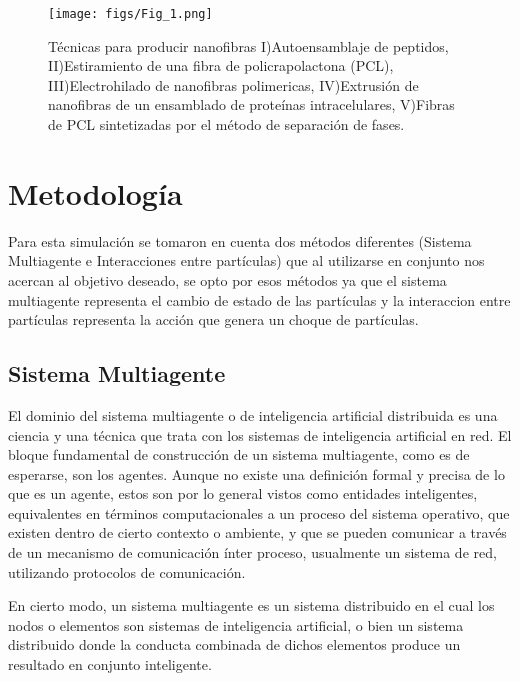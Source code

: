 \documentclass[a4paper,fleqn]{cas-sc}
\begin{document}
\begin{figure}[h]
	\centering
		\texttt{[image: figs/Fig\_1.png]}
	\caption{Técnicas para producir nanofibras I)Autoensamblaje de peptidos, II)Estiramiento de una fibra de policrapolactona (PCL), III)Electrohilado de nanofibras polimericas, IV)Extrusión de nanofibras de un ensamblado de proteínas intracelulares, V)Fibras de PCL sintetizadas por el método de separación de fases.}
	\label{FIG:1}
\end{figure}

\section{Metodología}
Para esta simulación se tomaron en cuenta dos métodos diferentes (Sistema Multiagente e Interacciones entre partículas) que al utilizarse en conjunto nos acercan al objetivo deseado, se opto por esos métodos ya que el sistema multiagente representa el cambio de estado de las partículas y la interaccion entre partículas representa la acción que genera un choque de partículas.

\subsection{Sistema Multiagente}
El dominio del sistema multiagente o de inteligencia artificial distribuida es una ciencia y una técnica que trata con los sistemas de inteligencia artificial en red. El bloque fundamental de construcción de un sistema multiagente, como es de esperarse, son los agentes. Aunque no existe una definición formal y precisa de lo que es un agente, estos son por lo general vistos como entidades inteligentes, equivalentes en términos computacionales a un proceso del sistema operativo, que existen dentro de cierto contexto o ambiente, y que se pueden comunicar a través de un mecanismo de comunicación ínter proceso, usualmente un sistema de red, utilizando protocolos de comunicación.

En cierto modo, un sistema multiagente es un sistema distribuido en el cual los nodos o elementos son sistemas de inteligencia artificial, o bien un sistema distribuido donde la conducta combinada de dichos elementos produce un resultado en conjunto inteligente.
\end{document}
